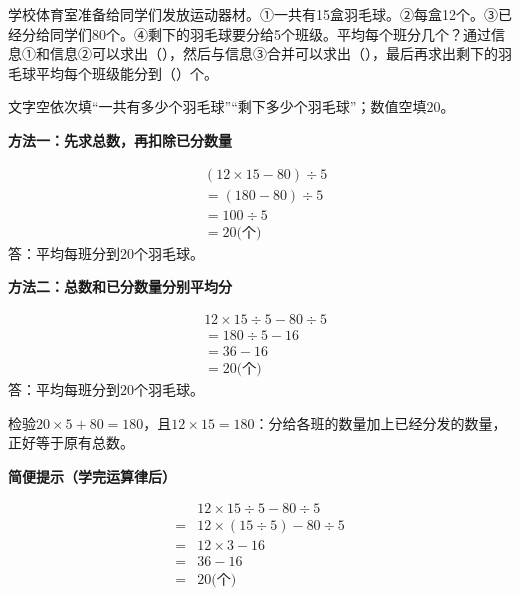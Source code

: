 学校体育室准备给同学们发放运动器材。①一共有15盒羽毛球。②每盒12个。③已经分给同学们80个。④剩下的羽毛球要分给5个班级。平均每个班分几个？通过信息①和信息②可以求出（\hspace{1.8em}），然后与信息③合并可以求出（\hspace{1.8em}），最后再求出剩下的羽毛球平均每个班级能分到（\hspace{1.8em}）个。\par
\begin{BookAnswer}
文字空依次填“一共有多少个羽毛球”“剩下多少个羽毛球”；数值空填\(20\)。\par \par\noindent\begin{minipage}{\linewidth}\textbf{方法一：先求总数，再扣除已分数量}\par \[\begin{aligned}&(12\times15-80)\div5\\&=(180-80)\div5\\&=100\div5\\&=20\text{(个)}\end{aligned}\]答：平均每班分到\(20\)个羽毛球。\end{minipage}\par \par \par\noindent\begin{minipage}{\linewidth}\textbf{方法二：总数和已分数量分别平均分}\par \[\begin{aligned}&12\times15\div5-80\div5\\&=180\div5-16\\&=36-16\\&=20\text{(个)}\end{aligned}\]答：平均每班分到\(20\)个羽毛球。\end{minipage}\par \par 检验\(20\times5+80=180\)，且\(12\times15=180\)：分给各班的数量加上已经分发的数量，正好等于原有总数。\par\textbf{简便提示（学完运算律后）}\par \[\begin{aligned}&12\times15\div5-80\div5\\={}&12\times(15\div5)-80\div5\\={}&12\times3-16\\={}&36-16\\={}&20\text{(个)}\end{aligned}\]
\end{BookAnswer}

